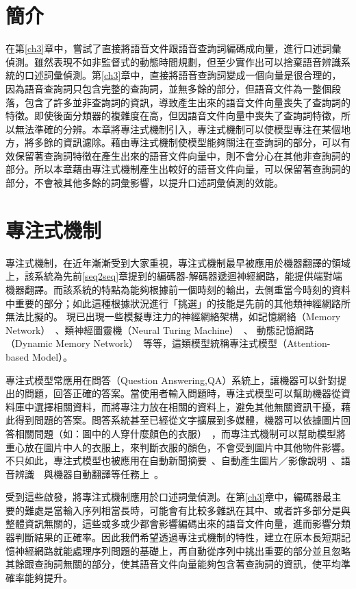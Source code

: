 \label{ch4}
\section{簡介}
在第\ref{ch3}章中，嘗試了直接將語音文件跟語音查詢詞編碼成向量，進行口述詞彙偵測。雖然表現不如非監督式的動態時間規劃，但至少實作出可以捨棄語音辨識系統的口述詞彙偵測。第\ref{ch3}章中，直接將語音查詢詞變成一個向量是很合理的，因為語音查詢詞只包含完整的查詢詞，並無多餘的部分，但語音文件為一整個段落，包含了許多並非查詢詞的資訊，導致產生出來的語音文件向量喪失了查詢詞的特徵。即使後面分類器的複雜度在高，但因語音文件向量中喪失了查詢詞特徵，所以無法準確的分辨。本章將專注式機制引入，專注式機制可以使模型專注在某個地方，將多餘的資訊濾除。藉由專注式機制使模型能夠關注在查詢詞的部分，可以有效保留著查詢詞特徵在產生出來的語音文件向量中，則不會分心在其他非查詢詞的部分。所以本章藉由專注式機制產生出較好的語音文件向量，可以保留著查詢詞的部分，不會被其他多餘的詞彙影響，以提升口述詞彙偵測的效能。
\section{專注式機制}
專注式機制，在近年漸漸受到大家重視，專注式機制最早被應用於機器翻譯的領域上，該系統為先前\ref{seq2seq}章提到的編碼器-解碼器遞迴神經網路，能提供端對端機器翻譯。而該系統的特點為能夠根據前一個時刻的輸出，去側重當今時刻的資料中重要的部分；如此這種根據狀況進行「挑選」的技能是先前的其他類神經網路所無法比擬的。
現已出現一些模擬專注力的神經網絡架構，如記憶網絡（Memory
Network）~\cite{sukhbaatar2015end}、類神經圖靈機（Neural Turing
Machine）~\cite{graves2014neural}、 動態記憶網路（Dynamic
Memory
Network）~\cite{kumar2015ask}等等，這類模型統稱專注式模型（Attention-based
Model）。

專注式模型常應用在問答（Question
Answering,QA）系統上，讓機器可以針對提出的問題，回答正確的答案。當使用者輸入問題時，專注式模型可以幫助機器從資料庫中選擇相關資料，而將專注力放在相關的資料上，避免其他無關資訊干擾，藉此得到問題的答案。問答系統甚至已經從文字擴展到多媒體，機器可以依據圖片回答相關問題（如：圖中的人穿什麼顏色的衣服）~\cite{agrawal2015vqa}，而專注式機制可以幫助模型將重心放在圖片中人的衣服上，來判斷衣服的顏色，不會受到圖片中其他物件影響。不只如此，專注式模型也被應用在自動新聞摘要~\cite{rush2015neural}、自動產生圖片／影像說明~\cite{xu2015show}、語音辨識~\cite{chan2016listen}~與機器自動翻譯等任務上~\cite{bahdanau2014neural}。

受到這些啟發，將專注式機制應用於口述詞彙偵測。在第\ref{ch3}章中，編碼器最主要的難處是當輸入序列相當長時，可能會有比較多雜訊在其中、或者許多部分是與整體資訊無關的，這些或多或少都會影響編碼出來的語音文件向量，進而影響分類器判斷結果的正確率。因此我們希望透過專注式機制的特性，建立在原本長短期記憶神經網路就能處理序列問題的基礎上，再自動從序列中挑出重要的部分並且忽略其餘跟查詢詞無關的部分，使其語音文件向量能夠包含著查詢詞的資訊，使平均準確率能夠提升。
